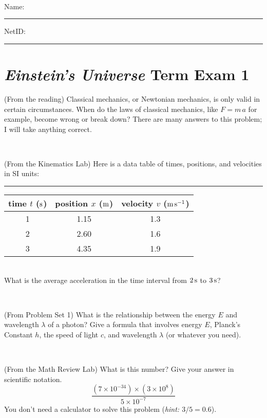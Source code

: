 \documentclass[12pt, letterpaper]{article}
\begin{document}
\vfill ~


\cleardoublepage



\noindent
Name: \rule[-1ex]{0.60\textwidth}{0.1pt}
NetID: \rule[-1ex]{0.20\textwidth}{0.1pt}

\section*{\textsl{Einstein's Universe} Term Exam 1}
\setcounter{problem}{1}


\begin{problem} (From the reading)
Classical mechanics, or Newtonian mechanics, is only valid in certain
circumstances. When do the laws of classical mechanics, like $F =
m\,a$ for example, become wrong or break down? There are many answers
to this problem; I will take anything correct.
\end{problem}


\vfill ~

\begin{problem} (From the Kinematics Lab)
Here is a data table of times, positions, and velocities in SI units:\\
\rule{1.0in}{0pt}\begin{tabular}{c|c|c}
time $t$ ($\mathrm{s}$) & position $x$ ($\mathrm{m}$) & velocity $v$ ($\mathrm{m}\,\mathrm{s}^{-1}$) \\
\hline
1 & 1.15 & 1.3 \\
2 & 2.60 & 1.6 \\
3 & 4.35 & 1.9 \\
\hline
\end{tabular}\\
What is the average acceleration in the time interval from $2\,\mathrm{s}$ to $3\,\mathrm{s}$?
\end{problem}


\vfill ~

\begin{problem} (From Problem Set 1)
What is the relationship between the energy $E$ and wavelength
$\lambda$ of a photon? Give a formula that involves energy $E$,
Planck's Constant $h$, the speed of light $c$, and wavelength
$\lambda$ (or whatever you need).
\end{problem}

\vfill ~

\begin{problem} (From the Math Review Lab)
What is this number? Give your answer in scientific notation.
$$
\frac{(7\times10^{-34})\times(3\times10^8)}{5\times10^{-7}}
$$
You don't need a calculator to solve this problem (\textit{hint: $3/5=0.6$}).
\end{problem}
\end{document}
